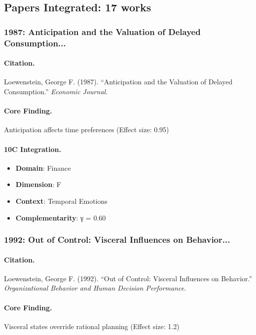 \subsection{Papers Integrated: 17 works}

\subsubsection{1987: Anticipation and the Valuation of Delayed Consumption...}

\paragraph{Citation.}
Loewenstein, George F. (1987). ``Anticipation and the Valuation of Delayed Consumption.''
\textit{Economic Journal}.

\paragraph{Core Finding.}
Anticipation affects time preferences (Effect size: 0.95)

\paragraph{10C Integration.}
\begin{itemize}[nosep]
  \item \textbf{Domain}: Finance
  \item \textbf{Dimension}: F
  \item \textbf{Context}: Temporal Emotions
  \item \textbf{Complementarity}: γ = 0.60
\end{itemize}

\subsubsection{1992: Out of Control: Visceral Influences on Behavior...}

\paragraph{Citation.}
Loewenstein, George F. (1992). ``Out of Control: Visceral Influences on Behavior.''
\textit{Organizational Behavior and Human Decision Performance}.

\paragraph{Core Finding.}
Visceral states override rational planning (Effect size: 1.2)

